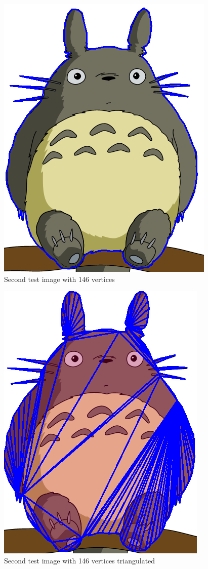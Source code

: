 \documentclass[conference]{IEEEtran}
\begin{document}
\begin{figure}
    \centering
    \includegraphics[scale =0.3]{totoro1Enclosed}
    \caption{Second test image with 146 vertices}
\end{figure}
\begin{figure}
    \centering
    \includegraphics[scale =0.3]{totoro146Triangulated}
    \caption{Second test image with 146 vertices triangulated}
\end{figure}
\end{document}
